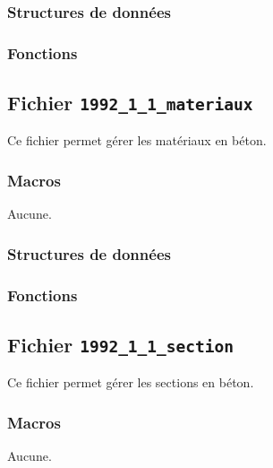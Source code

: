 \documentclass{article}
\begin{document}
\subsubsection{Structures de données}


\subsubsection{Fonctions}












\subsection{Fichier {\texttt{1992\_1\_1\_materiaux}}}
Ce fichier permet gérer les matériaux en béton.
\subsubsection{Macros}
Aucune.
\subsubsection{Structures de données}

\subsubsection{Fonctions}








\subsection{Fichier {\texttt{1992\_1\_1\_section}}}
Ce fichier permet gérer les sections en béton.
\subsubsection{Macros}
Aucune.
\end{document}
